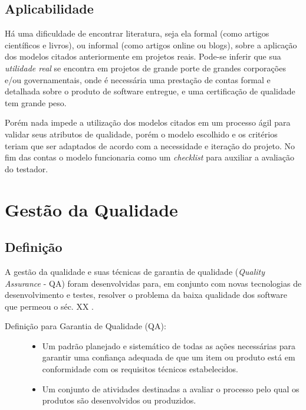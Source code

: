\documentclass[
	12pt,				%
	openright,			%
	oneside,			%
	a4paper,			%
	english,			%
	brazil,				%
	]{abntex2}
\begin{document}
\section{Aplicabilidade}
Há uma dificuldade de encontrar literatura, seja ela formal (como artigos científicos e livros), ou informal (como artigos online ou blogs), sobre a aplicação dos modelos citados anteriormente em projetos reais. Pode-se inferir que sua \emph{utilidade real} se encontra em projetos de grande porte de grandes corporações e/ou governamentais, onde é necessária uma prestação de contas formal e detalhada sobre o produto de software entregue, e uma certificação de qualidade tem grande peso.

Porém nada impede a utilização dos modelos citados em um processo ágil para validar seus atributos de qualidade, porém o modelo escolhido e os critérios teriam que ser adaptados de acordo com a necessidade e iteração do projeto. No fim das contas o modelo funcionaria como um \emph{checklist} para auxiliar a avaliação do testador.

\chapter{Gestão da Qualidade}

\section{Definição}
A gestão da qualidade e suas técnicas de garantia de qualidade (\emph{Quality Assurance} - QA) foram desenvolvidas para, em conjunto com novas tecnologias de desenvolvimento e testes, resolver o problema da baixa qualidade dos software que permeou o séc. XX \cite{SOMMERVILLE2011}.

\begin{description}
    \item[Definição  para Garantia de Qualidade (QA):] \hfill
        \begin{itemize}
            \item Um padrão planejado e sistemático de todas as ações necessárias para garantir uma confiança adequada de que um item ou produto está em conformidade com os requisitos técnicos estabelecidos.
            \item Um conjunto de atividades destinadas a avaliar o processo pelo qual os produtos são desenvolvidos ou produzidos.
        \end{itemize}
\end{description}
\end{document}
